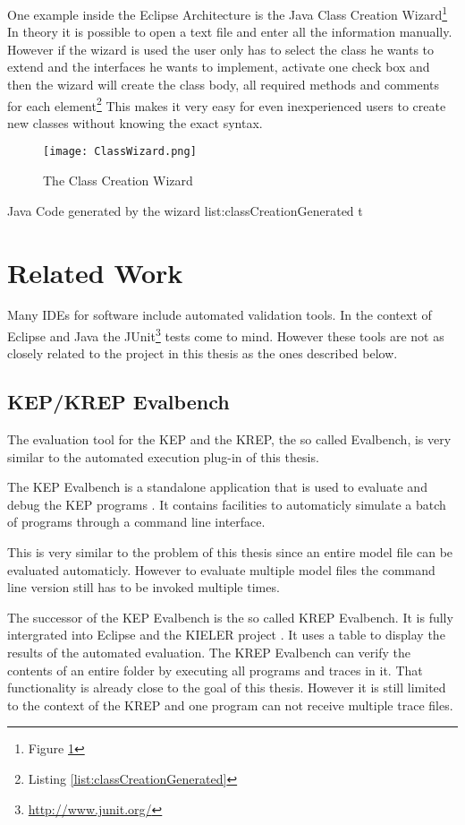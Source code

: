 One example inside the Eclipse Architecture is the Java Class Creation Wizard\footnote{Figure \ref{fig:ClassWizard}}
In theory it is possible to open a text file and enter all the information manually.
However if the wizard is used the user only has to select the class he wants to extend
and the interfaces he wants to implement, activate one check box and then the wizard will
create the class body, all required methods and comments for each element\footnote{Listing \ref{list:classCreationGenerated}}
This makes it very easy for even inexperienced users to create new classes without knowing
the exact syntax.
\begin{figure}
  \centering
  \texttt{[image: ClassWizard.png]}
  \caption[The Class Creation Wizard]%
  {The Class Creation Wizard\protect}
  \label{fig:ClassWizard}
\end{figure}

\listingjava
{}
{Java}
{Code generated by the wizard}
{list:classCreationGenerated}
{t}

\section{Related Work}
Many \ac{IDE}s for software include automated validation tools. In the context of
Eclipse and Java the JUnit\footnote{\url{http://www.junit.org/}} tests come to mind. However these tools are not as closely related
to the project in this thesis as the ones described below.

\subsection{KEP/KREP Evalbench}
The evaluation tool for the \ac{KEP} and the \ac{KREP}, the so called Evalbench, is very similar
to the automated execution plug-in of this thesis. 

The \ac{KEP} Evalbench is a standalone application that is used to evaluate and debug the
\ac{KEP} programs \cite{evalbench1}. It contains facilities to automaticly simulate a
batch of programs through a command line interface.

This is very similar to the problem of this thesis since an entire model file can be
evaluated automaticly. However to evaluate multiple model files the command line version
still has to be invoked multiple times.

The successor of the \ac{KEP} Evalbench is the so called \ac{KREP} Evalbench. It is
fully intergrated into Eclipse and the \ac{KIELER} project \cite{evalbench2}. It uses a table to display
the results of the automated evaluation. The \ac{KREP} Evalbench can verify the 
contents of an entire folder by executing all programs and traces in it. %
That functionality is already close to the goal of this thesis. However it is still
limited to the context of the \ac{KREP} and one program can not receive multiple
trace files.

